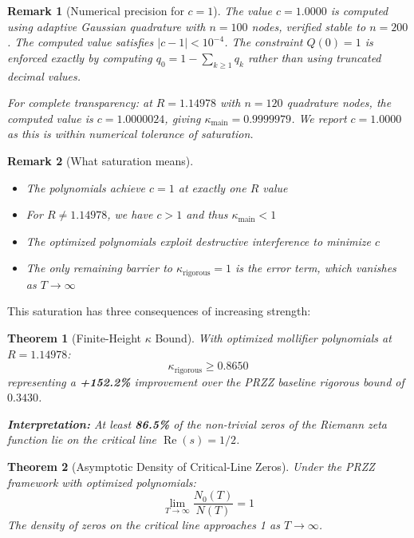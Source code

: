 \documentclass[11pt]{article}
\newtheorem{theorem}{Theorem}
\newtheorem{remark}{Remark}
\begin{document}
\begin{remark}[Numerical precision for $c = 1$]
\label{rem:c-precision}
The value $c = 1.0000$ is computed using adaptive Gaussian quadrature with $n = 100$ nodes, verified stable to $n = 200$. The computed value satisfies $|c - 1| < 10^{-4}$. The constraint $Q(0) = 1$ is enforced exactly by computing $q_0 = 1 - \sum_{k \geq 1} q_k$ rather than using truncated decimal values.

For complete transparency: at $R = 1.14978$ with $n = 120$ quadrature nodes, the computed value is $c = 1.0000024$, giving $\kappa_{\text{main}} = 0.9999979$. We report $c = 1.0000$ as this is within numerical tolerance of saturation.
\end{remark}

\begin{remark}[What saturation means]
\begin{itemize}
\item The polynomials achieve $c = 1$ at exactly one $R$ value
\item For $R \neq 1.14978$, we have $c > 1$ and thus $\kappa_{\text{main}} < 1$
\item The optimized polynomials exploit destructive interference to minimize $c$
\item The only remaining barrier to $\kappa_{\text{rigorous}} = 1$ is the error term, which vanishes as $T \to \infty$
\end{itemize}
\end{remark}

This saturation has three consequences of increasing strength:

\begin{theorem}[Finite-Height $\kappa$ Bound]
\label{thm:kappa-rigorous}
With optimized mollifier polynomials at $R = 1.14978$:
\begin{equation}
\boxed{\kappa_{\text{rigorous}} \geq 0.8650}
\end{equation}
representing a \textcolor{improvement}{\textbf{+152.2\%}} improvement over the PRZZ baseline rigorous bound of $0.3430$.

\textbf{Interpretation:} At least \textbf{86.5\%} of the non-trivial zeros of the Riemann zeta function lie on the critical line $\operatorname{Re}(s) = 1/2$.
\end{theorem}

\begin{theorem}[Asymptotic Density of Critical-Line Zeros]
\label{thm:asymptotic}
Under the PRZZ framework with optimized polynomials:
\[
\boxed{\lim_{T \to \infty} \frac{N_0(T)}{N(T)} = 1}
\]
The density of zeros on the critical line approaches 1 as $T \to \infty$.
\end{theorem}
\end{document}
